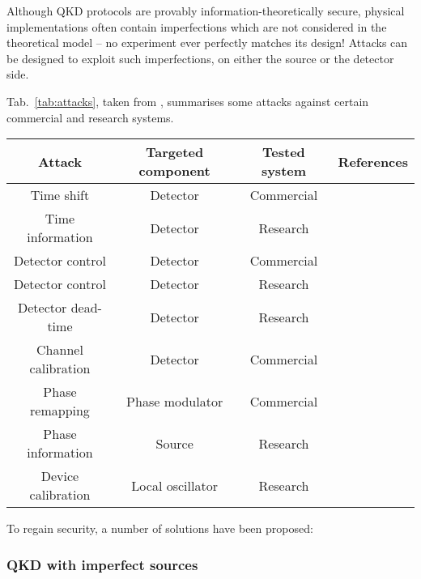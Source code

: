 Although QKD protocols are provably information-theoretically secure, physical implementations often contain imperfections which are not considered in the theoretical model -- no experiment ever perfectly matches its design! Attacks can be designed to exploit such imperfections, on either the source or the detector side.

Tab.~\ref{tab:attacks}, taken from \cite{bib:lo2014secure}, summarises some attacks against certain commercial and research systems.

\startnormtable
\begin{table*}[!htbp]
\begin{tabular}{|c|c|c|c|} 
 \hline
 Attack &  Targeted component & Tested system & References\\ 
  \hline
  \hline
Time shift
        & Detector & Commercial & \cite{bib:qi2005time, bib:PhysRevA.78.042333, bib:PhysRevA.74.022313}\\
Time information & Detector & Research & \cite{bib:lamas2007breaking} \\
Detector control & Detector  &   Commercial & \cite{bib:lydersen2010hacking, bib:yuan2010avoiding}\\
Detector control  & Detector  & Research & \cite{bib:gerhardt2011full} \\
Detector dead-time      & Detector  & Research   & \cite{bib:weier2011quantum}      \\
Channel calibration    & Detector  &  Commercial  & \cite{bib:jain2011device}      \\
Phase remapping  &  Phase modulator & Commercial & \cite{bib:xu2010experimental} \\
Phase information & Source & Research & \cite{bib:tang2013source}          \\
Device calibration  & Local oscillator & Research & \cite{bib:jouguet2013preventing} \\
                \hline
\end{tabular}
\caption{\label{tab:attacks} Summary of various attacks against some commercial and 
research QKD systems.}
\end{table*}
\startalgtable

To regain security, a number of solutions have been proposed:

\subsubsection{QKD with imperfect sources}

